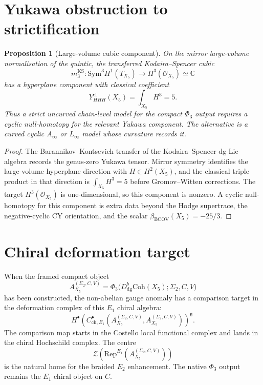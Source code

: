 \documentclass[11pt]{amsart}
\newtheorem{proposition}[theorem]{Proposition}
\providecommand{\bBCOV}{\beta_{\mathrm{BCOV}}}
\providecommand{\fg}{\mathfrak{g}}
\providecommand{\cO}{\mathcal{O}}
\providecommand{\cZ}{\mathcal{Z}}
\providecommand{\CC}{\mathbb{C}}
\providecommand{\Sym}{\mathrm{Sym}}
\providecommand{\Coh}{\mathrm{Coh}}
\providecommand{\Rep}{\mathrm{Rep}}
\begin{document}
\section*{Yukawa obstruction to strictification}
\label{sec:hcs-quintic-yukawa}

\begin{proposition}[Large-volume cubic component]
\label{prop:hcs-quintic-yukawa}
On the mirror large-volume normalisation of the quintic, the transferred
Kodaira--Spencer cubic
\[
  m_3^{\mathrm{KS}}:
  \Sym^3 H^1(T_{X_5})\longrightarrow H^3(\cO_{X_5})\simeq\CC
\]
has a hyperplane component with classical coefficient
\[
  Y_{HHH}^{\mathrm{cl}}(X_5)=\int_{X_5}H^3=5.
\]
Thus a strict uncurved chain-level model for the compact $\Phi_3$
output requires a cyclic null-homotopy for the relevant Yukawa
component. The alternative is a curved cyclic $A_\infty$ or
$L_\infty$ model whose curvature records it.
\end{proposition}

\begin{proof}
The Barannikov--Kontsevich transfer of the Kodaira--Spencer dg Lie
algebra records the genus-zero Yukawa tensor. Mirror symmetry identifies
the large-volume hyperplane direction with $H\in H^2(X_5)$, and the
classical triple product in that direction is
$\int_{X_5}H^3=5$ before Gromov--Witten corrections. The target
$H^3(\cO_{X_5})$ is one-dimensional, so this component is nonzero. A
cyclic null-homotopy for this component is extra data beyond the Hodge
supertrace, the negative-cyclic CY orientation, and the scalar
$\bBCOV(X_5)=-25/3$.
\end{proof}

\section*{Chiral deformation target}
\label{sec:hcs-quintic-chiral-comparison}

When the framed compact object
\[
  A_{X_5}^{(\Sigma_2,C,V)}
  =
  \Phi_3\bigl(D^b_{\mathrm{dg}}\Coh(X_5);\Sigma_2,C,V\bigr)
\]
has been constructed, the non-abelian gauge anomaly has a comparison
target in the deformation complex of this $E_1$ chiral algebra:
\[
  H^\bullet\!\left(
  C^\bullet_{\mathrm{ch},E_1}
  (A_{X_5}^{(\Sigma_2,C,V)},A_{X_5}^{(\Sigma_2,C,V)})
  \right)^\fg .
\]
The comparison map starts in the Costello local functional complex and
lands in the chiral Hochschild complex. The centre
\[
  \cZ\!\left(\Rep^{E_1}(A_{X_5}^{(\Sigma_2,C,V)})\right)
\]
is the natural home for the braided $E_2$ enhancement. The native
$\Phi_3$ output remains the $E_1$ chiral object on $C$.
\end{document}

